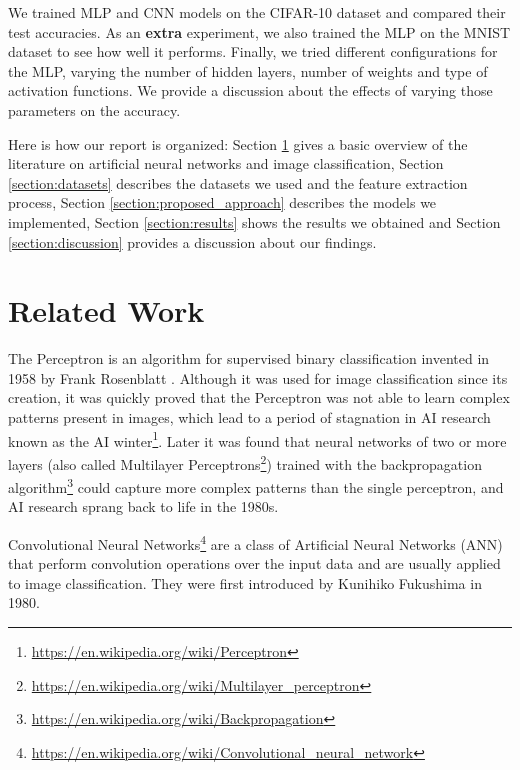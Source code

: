 \documentclass[conference]{IEEEtran}
\begin{document}

We trained MLP and CNN models on the CIFAR-10 dataset and compared their test accuracies. As an \textbf{extra} experiment, we also trained the MLP on the MNIST dataset to see how well it performs. Finally, we tried different configurations for the MLP, varying the number of hidden layers, number of weights and type of activation functions. We provide a discussion about the effects of varying those parameters on the accuracy.

Here is how our report is organized: Section \ref{section:related_work} gives a basic overview of the literature on artificial neural networks and image classification, Section \ref{section:datasets} describes the datasets we used and the feature extraction process, Section \ref{section:proposed_approach} describes the models we implemented, Section \ref{section:results} shows the results we obtained and Section \ref{section:discussion} provides a discussion about our findings.

\section{Related Work}
\label{section:related_work}

The Perceptron is an algorithm for supervised binary classification invented in 1958 by Frank Rosenblatt \cite{rosenblatt1957perceptron}. Although it was used for image classification since its creation, it was quickly proved that the Perceptron was not able to learn complex patterns present in images, which lead to a period of stagnation in AI research known as the AI winter\footnote{\url{https://en.wikipedia.org/wiki/Perceptron}}. Later it was found that neural networks of two or more layers (also called Multilayer Perceptrons\footnote{\url{https://en.wikipedia.org/wiki/Multilayer\_perceptron}}) trained with the backpropagation algorithm\footnote{\url{https://en.wikipedia.org/wiki/Backpropagation}} could capture more complex patterns than the single perceptron, and AI research sprang back to life in the 1980s.

Convolutional Neural Networks\footnote{\url{https://en.wikipedia.org/wiki/Convolutional\_neural\_network}} are a class of Artificial Neural Networks (ANN) that perform convolution operations over the input data and are usually applied to image classification. They were first introduced by Kunihiko Fukushima in 1980\cite{fukushima1980neocognitron}.
\end{document}

